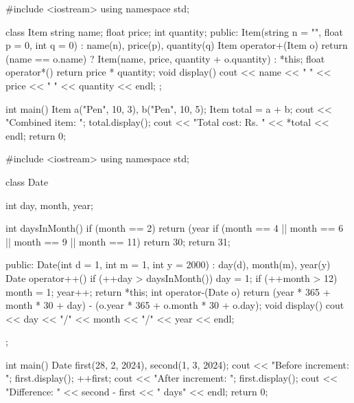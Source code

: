 \outputlabel
{}


\codelabel

\begin{code}
#include <iostream>
using namespace std;

class Item {
    string name; float price; int quantity;
public:
    Item(string n = "", float p = 0, int q = 0) : name(n), price(p), quantity(q) {}
    Item operator+(Item o) {
        return (name == o.name) ? Item(name, price, quantity + o.quantity) : *this;
    }
    float operator*() { return price * quantity; }
    void display() { cout << name << " " << price << " " << quantity << endl; }
};

int main() {
    Item a("Pen", 10, 3), b("Pen", 10, 5);
    Item total = a + b;
    cout << "Combined item: "; total.display();
    cout << "Total cost: Rs. " << *total << endl;
    return 0;
}
\end{code}

\outputlabel
{}


\codelabel

\begin{code}
#include <iostream>
using namespace std;

class Date {
    int day, month, year;

    int daysInMonth() {
        if (month == 2)
            return (year %
        if (month == 4 || month == 6 || month == 9 || month == 11)
            return 30;
        return 31;
    }

public:
    Date(int d = 1, int m = 1, int y = 2000) : day(d), month(m), year(y) {}
    Date operator++() {
        if (++day > daysInMonth()) { day = 1; if (++month > 12) { month = 1; year++; } }
        return *this;
    }
    int operator-(Date o) {
        return (year * 365 + month * 30 + day) - (o.year * 365 + o.month * 30 + o.day);
    }
    void display() { cout << day << "/" << month << "/" << year << endl; }
};

int main() {
    Date first(28, 2, 2024), second(1, 3, 2024);
    cout << "Before increment: "; first.display();
    ++first;
    cout << "After increment: "; first.display();
    cout << "Difference: " << second - first << " days" << endl;
    return 0;
}
\end{code}

